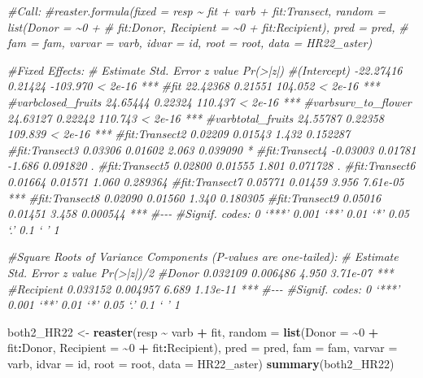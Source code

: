 \documentclass[
]{article}
\newenvironment{Shaded}{\begin{snugshade}}{\end{snugshade}}
\newcommand{\AttributeTok}[1]{\textcolor[rgb]{0.13,0.29,0.53}{#1}}
\newcommand{\CommentTok}[1]{\textcolor[rgb]{0.56,0.35,0.01}{\textit{#1}}}
\newcommand{\DecValTok}[1]{\textcolor[rgb]{0.00,0.00,0.81}{#1}}
\newcommand{\FunctionTok}[1]{\textcolor[rgb]{0.13,0.29,0.53}{\textbf{#1}}}
\newcommand{\NormalTok}[1]{#1}
\newcommand{\OtherTok}[1]{\textcolor[rgb]{0.56,0.35,0.01}{#1}}
\newcommand{\SpecialCharTok}[1]{\textcolor[rgb]{0.81,0.36,0.00}{\textbf{#1}}}
\begin{document}
\begin{Shaded}
\begin{Highlighting}[]
\CommentTok{\#Call:}
\CommentTok{\#reaster.formula(fixed = resp \textasciitilde{} fit + varb + fit:Transect, random = list(Donor = \textasciitilde{}0 + }
\CommentTok{\#    fit:Donor, Recipient = \textasciitilde{}0 + fit:Recipient), pred = pred, }
\CommentTok{\#    fam = fam, varvar = varb, idvar = id, root = root, data = HR22\_aster)}


\CommentTok{\#Fixed Effects:}
\CommentTok{\#                    Estimate Std. Error  z value Pr(\textgreater{}|z|)    }
\CommentTok{\#(Intercept)        {-}22.27416    0.21424 {-}103.970  \textless{} 2e{-}16 ***}
\CommentTok{\#fit                 22.42368    0.21551  104.052  \textless{} 2e{-}16 ***}
\CommentTok{\#varbclosed\_fruits   24.65444    0.22324  110.437  \textless{} 2e{-}16 ***}
\CommentTok{\#varbsurv\_to\_flower  24.63127    0.22242  110.743  \textless{} 2e{-}16 ***}
\CommentTok{\#varbtotal\_fruits    24.55787    0.22358  109.839  \textless{} 2e{-}16 ***}
\CommentTok{\#fit:Transect2        0.02209    0.01543    1.432 0.152287    }
\CommentTok{\#fit:Transect3        0.03306    0.01602    2.063 0.039090 *  }
\CommentTok{\#fit:Transect4       {-}0.03003    0.01781   {-}1.686 0.091820 .  }
\CommentTok{\#fit:Transect5        0.02800    0.01555    1.801 0.071728 .  }
\CommentTok{\#fit:Transect6        0.01664    0.01571    1.060 0.289364    }
\CommentTok{\#fit:Transect7        0.05771    0.01459    3.956 7.61e{-}05 ***}
\CommentTok{\#fit:Transect8        0.02090    0.01560    1.340 0.180305    }
\CommentTok{\#fit:Transect9        0.05016    0.01451    3.458 0.000544 ***}
\CommentTok{\#{-}{-}{-}}
\CommentTok{\#Signif. codes:  0 ‘***’ 0.001 ‘**’ 0.01 ‘*’ 0.05 ‘.’ 0.1 ‘ ’ 1}

\CommentTok{\#Square Roots of Variance Components (P{-}values are one{-}tailed):}
\CommentTok{\#          Estimate Std. Error z value Pr(\textgreater{}|z|)/2    }
\CommentTok{\#Donor     0.032109   0.006486   4.950   3.71e{-}07 ***}
\CommentTok{\#Recipient 0.033152   0.004957   6.689   1.13e{-}11 ***}
\CommentTok{\#{-}{-}{-}}
\CommentTok{\#Signif. codes:  0 ‘***’ 0.001 ‘**’ 0.01 ‘*’ 0.05 ‘.’ 0.1 ‘ ’ 1}

\NormalTok{both2\_HR22 }\OtherTok{\textless{}{-}} \FunctionTok{reaster}\NormalTok{(resp }\SpecialCharTok{\textasciitilde{}}\NormalTok{ varb }\SpecialCharTok{+}\NormalTok{ fit, }\AttributeTok{random =} \FunctionTok{list}\NormalTok{(}\AttributeTok{Donor =} \SpecialCharTok{\textasciitilde{}}\DecValTok{0} \SpecialCharTok{+} 
\NormalTok{    fit}\SpecialCharTok{:}\NormalTok{Donor, }\AttributeTok{Recipient =} \SpecialCharTok{\textasciitilde{}}\DecValTok{0} \SpecialCharTok{+}\NormalTok{ fit}\SpecialCharTok{:}\NormalTok{Recipient), }\AttributeTok{pred =}\NormalTok{ pred, }\AttributeTok{fam =}\NormalTok{ fam, }\AttributeTok{varvar =}\NormalTok{ varb, }
    \AttributeTok{idvar =}\NormalTok{ id, }\AttributeTok{root =}\NormalTok{ root, }\AttributeTok{data =}\NormalTok{ HR22\_aster)}
\FunctionTok{summary}\NormalTok{(both2\_HR22)}
\end{Highlighting}
\end{Shaded}
\end{document}
